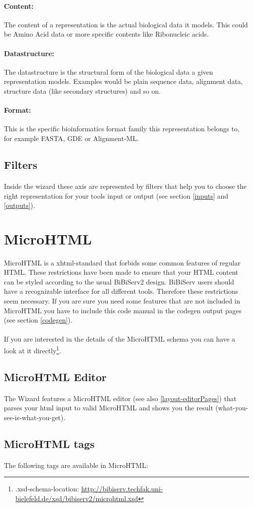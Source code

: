 \documentclass[a4paper,10pt]{book}
\newcommand{\htmlstandardI}[2]{
\paragraph{} #1 is a xhtml-standard that forbids some common features of regular HTML. These restrictions have been made to ensure that your HTML content can be styled according to the usual BiBiServ2 design. BiBiServ users should have a recognizable interface for all different tools. Therefore these restrictions seem necessary. If you are sure you need some features that are not included in #1 you have to include this code manual in the codegen output pages (see section \ref{codegen}).
\paragraph{} If you are interested in the details of the #1 schema you can have a look at it directly\footnote{.xsd-schema-location: \url{#2}}.
}
\newcommand{\htmlstandardII}[1]{
\paragraph{} The Wizard features a #1 editor (see also \ref{layout-editorPages}) that parses your html input to valid #1 and shows you the result (what-you-see-is-what-you-get).
}
\begin{document}
\paragraph{Content:} The content of a representation is the actual biological data it models. This could be Amino Acid data or more specific contents like Ribonucleic acids.
\paragraph{Datastructure:} The datastructure is the structural form of the biological data a given representation models. Examples would be plain sequence data, alignment data, structure data (like secondary structures) and so on.
\paragraph{Format:} This is the specific bioinformatics format family this representation belongs to, for example FASTA, GDE or Alignment-ML.
\subsection{Filters}
\paragraph{} Inside the wizard these axis are represented by filters that help you to choose the right representation for your tools input or output (see section \ref{inputs} and \ref{outputs}).

\section{MicroHTML}
\label{microhtml}
\htmlstandardI{MicroHTML}{http://bibiserv.techfak.uni-bielefeld.de/xsd/bibiserv2/microhtml.xsd}
\subsection{MicroHTML Editor}
\htmlstandardII{MicroHTML}
\subsection{MicroHTML tags}
\paragraph{} The following tags are available in MicroHTML:
\end{document}
